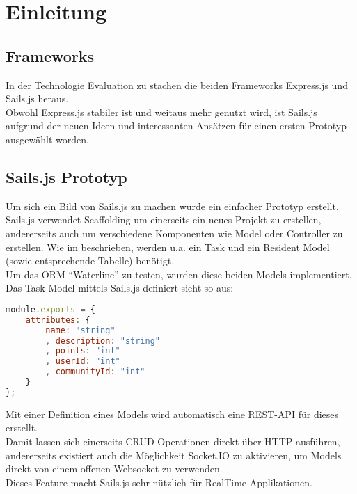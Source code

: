 \section{Einleitung}

\subsection*{Frameworks}
In der Technologie Evaluation zu  stachen die beiden Frameworks Express.js \cite{Expressjs}
und Sails.js \cite{sails} heraus.\\
Obwohl Express.js stabiler ist und weitaus mehr genutzt wird, ist Sails.js aufgrund der neuen Ideen und interessanten Ansätzen für einen ersten Prototyp ausgewählt worden.

\subsection{Sails.js Prototyp}
Um sich ein Bild von Sails.js zu machen wurde ein einfacher Prototyp \cite{SailsPrototyp} erstellt.\\[0.5mm]

Sails.js verwendet \gls{Scaffolding} um einerseits ein neues Projekt zu erstellen, andererseits auch um verschiedene Komponenten wie Model oder Controller zu erstellen.
Wie im  beschrieben, werden u.a. ein Task und ein Resident Model (sowie entsprechende Tabelle) benötigt.\\
Um das \gls{ORM} ``Waterline'' \cite{Waterline} zu testen, wurden diese beiden Models implementiert.\\
Das Task-Model mittels Sails.js definiert sieht so aus:\\

\begin{lstlisting}[language=JavaScript, caption=Task Model in Sails.js]
module.exports = {
	attributes: {
		name: "string"
		, description: "string"
		, points: "int"
		, userId: "int"
		, communityId: "int"
	}
};
\end{lstlisting}

Mit einer Definition eines Models wird automatisch eine \gls{REST}-API für dieses erstellt.\\
Damit lassen sich einerseits CRUD-Operationen direkt über HTTP ausführen, andererseits existiert auch die Möglichkeit Socket.IO \cite{SocketIO} zu aktivieren, um Models direkt von einem offenen \gls{Websocket} zu verwenden.\\
Dieses Feature macht Sails.js sehr nützlich für \gls{RealTime}-Applikationen.\\[0.5mm]

